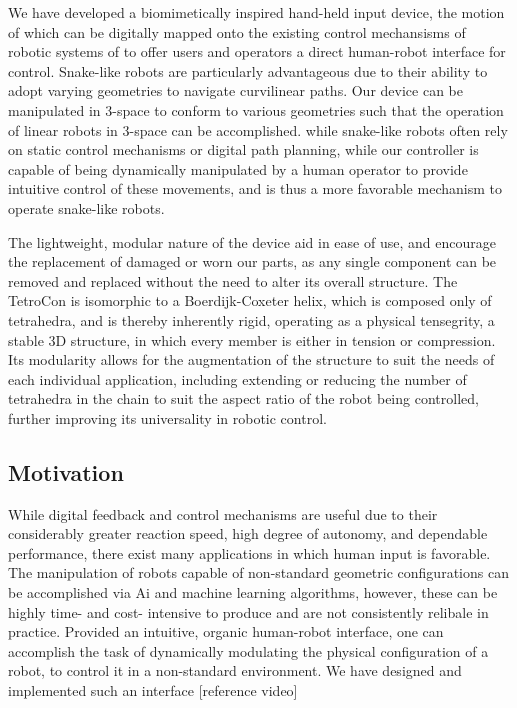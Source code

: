 \documentclass[11pt]{article}
\begin{document}
  We have developed a biomimetically inspired hand-held input device, the motion of which can be digitally mapped onto the existing control mechansisms of robotic systems of to offer users and operators a direct human-robot interface for control. Snake-like robots are particularly advantageous due to their ability to adopt varying geometries to navigate curvilinear paths. Our device can be manipulated in 3-space to conform to various geometries such that the operation of linear robots in 3-space can be accomplished. while snake-like robots often rely on static control mechanisms or digital path planning, while our controller is capable of being dynamically manipulated by a human operator to provide  intuitive control of these  movements, and is thus a more favorable mechanism to operate snake-like robots. 

  The lightweight, modular nature of the device aid in ease of use, and encourage the replacement of damaged or worn our parts, as any single component can be removed and replaced without the need to alter its overall structure. The TetroCon is isomorphic to a Boerdijk-Coxeter helix, which is composed only of tetrahedra, and is thereby inherently rigid, operating as a physical tensegrity, a stable 3D structure, in which every member is either in tension or compression. Its modularity allows for the augmentation of the structure to suit the needs of each individual application, including extending or reducing the number of tetrahedra in the chain to suit the aspect ratio of the robot being controlled, further improving its universality in robotic control.

\subsection{Motivation}

While digital feedback and control mechanisms are useful due to their considerably greater reaction speed, high degree of autonomy, and dependable performance, there exist many applications in which human input is favorable. The  manipulation of robots capable of non-standard geometric configurations can be accomplished via Ai and machine learning algorithms, however, these can be highly time- and cost- intensive to produce and are not consistently relibale in practice. Provided an intuitive, organic human-robot interface, one can accomplish the task of dynamically modulating the physical configuration of a robot, to control it in a non-standard environment.
We have designed and implemented such an interface [reference video]
\end{document}
